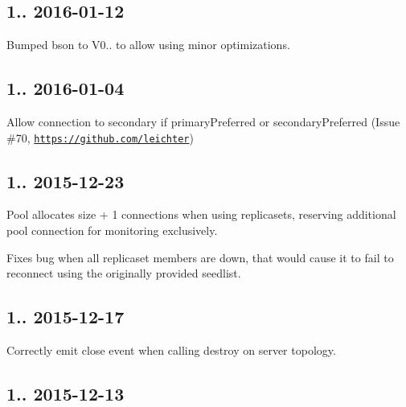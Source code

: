 \subsection*{1.. 2016-\/01-\/12 }


\begin{DoxyItemize}
\item Bumped bson to V0.. to allow using minor optimizations.
\end{DoxyItemize}

\subsection*{1.. 2016-\/01-\/04 }


\begin{DoxyItemize}
\item Allow connection to secondary if primary\+Preferred or secondary\+Preferred (Issue \#70, \href{https://github.com/leichter}{\tt https\+://github.\+com/leichter})
\end{DoxyItemize}

\subsection*{1.. 2015-\/12-\/23 }


\begin{DoxyItemize}
\item Pool allocates size + 1 connections when using replicasets, reserving additional pool connection for monitoring exclusively.
\item Fixes bug when all replicaset members are down, that would cause it to fail to reconnect using the originally provided seedlist.
\end{DoxyItemize}

\subsection*{1.. 2015-\/12-\/17 }


\begin{DoxyItemize}
\item Correctly emit close event when calling destroy on server topology.
\end{DoxyItemize}

\subsection*{1.. 2015-\/12-\/13 }


